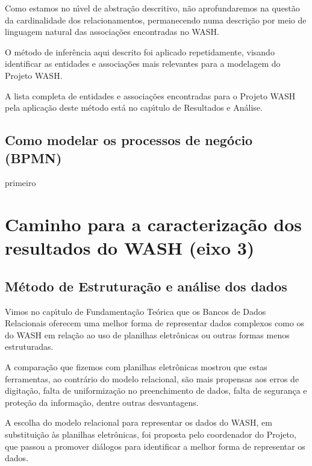 \documentclass[
12pt,		%
openright,	%
twoside,  %
a4paper,			%
chapter=TITLE,		%
english,			%
french,				%
spanish,			%
brazil				%
]{USPSC-classe/USPSC}
\begin{document}
Como estamos no n\'{\i}vel de abstra\c{c}\~ao descritivo, n\~ao aprofundaremos na quest\~ao da cardinalidade dos relacionamentos, permanecendo numa descri\c{c}\~ao por meio de linguagem natural das associa\c{c}\~oes encontradas no WASH.


O m\'etodo de infer\^encia aqui descrito foi aplicado repetidamente, visando identificar as entidades e associa\c{c}\~oes mais relevantes para a modelagem do Projeto WASH.


A lista completa de entidades e associa\c{c}\~oes encontradas para o Projeto WASH pela aplica\c{c}\~ao deste m\'etodo est\'a no cap\'{\i}tulo de Resultados e An\'alise.


\subsection[Como modelar os processos de neg\'ocio (BPMN)]{Como modelar os processos de neg\'ocio (BPMN)}\label{Como modelar os processos de neg\'ocio (BPMN)}
primeiro


\section[Caminho para a caracteriza\c{c}\~ao dos resultados do WASH (eixo 3)]{Caminho para a caracteriza\c{c}\~ao dos resultados do WASH (eixo 3)}\label{Caminho para a caracteriza\c{c}\~ao dos resultados do WASH (eixo 3)}
\subsection[M\'etodo de Estrutura\c{c}\~ao e an\'alise dos dados]{M\'etodo de Estrutura\c{c}\~ao e an\'alise dos dados}\label{M\'etodo de Estrutura\c{c}\~ao e an\'alise dos dados}
Vimos no cap\'{\i}tulo de Fundamenta\c{c}\~ao Te\'orica que os Bancos de Dados Relacionais oferecem uma melhor forma de representar dados complexos como os do WASH em rela\c{c}\~ao ao uso de planilhas eletr\^onicas ou outras formas menos estruturadas.


A compara\c{c}\~ao que fizemos com planilhas eletr\^onicas mostrou que estas ferramentas, ao contr\'ario do modelo relacional, s\~ao mais propensas aos erros de digita\c{c}\~ao, falta de uniformiza\c{c}\~ao no preenchimento de dados, falta de seguran\c{c}a e prote\c{c}\~ao da informa\c{c}\~ao, dentre outras desvantagens.


A escolha do modelo relacional para representar os dados do WASH, em substitui\c{c}\~ao \`as planilhas eletr\^onicas, foi proposta pelo coordenador do Projeto, que passou a promover di\'alogos para identificar a melhor forma de representar os dados.
\end{document}
